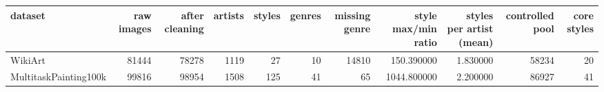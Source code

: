 \begin{tabular}{lrrrrrrrrrr}
\toprule
dataset & raw images & after cleaning & artists & styles & genres & missing genre & style max/min ratio & styles per artist (mean) & controlled pool & core styles \\
\midrule
WikiArt & 81444 & 78278 & 1119 & 27 & 10 & 14810 & 150.390000 & 1.830000 & 58234 & 20 \\
MultitaskPainting100k & 99816 & 98954 & 1508 & 125 & 41 & 65 & 1044.800000 & 2.200000 & 86927 & 41 \\
\bottomrule
\end{tabular}
